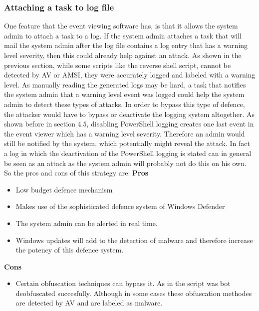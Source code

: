 \documentclass{article}%
\begin{document}
\subsubsection{Attaching a task to log file}
One feature that the event viewing software has, is that it allows the system admin to attach a task to a log. If the system admin attaches a task that will mail the system admin after the log file contains a log entry that has a warning level severity, then this could already help against an attack. As shown in the previous section, while some scripts like the reverse shell script, cannot be detected by AV or AMSI, they were accurately logged and labeled with a warning level. As manually reading the generated logs may be hard, a task that notifies the system admin that a warning level event was logged could help the system admin to detect these types of attacks. In order to bypass this type of defence, the attacker would have to bypass or deactivate the logging system altogether. As shown before in section $4.5$, disabling PowerShell logging creates one last event in the event viewer which has a warning level severity. Therefore an admin would still be notified by the system, which potentially might reveal the attack. In fact a log in which the deactivation of the PowerShell logging is stated can in general be seen as an attack as the system admin will probably not do this on his own. So the pros and cons of this strategy are:
\textbf{Pros}
\begin{itemize}
	\item Low budget defence mechanism
	\item Makes use of the sophisticated defence system of Windows Defender
	\item The system admin can be alerted in real time.
	\item Windows updates will add to the detection of malware and therefore increase the potency of this defence system.
\end{itemize}
\textbf{Cons}
\begin{itemize}
	\item Certain obfuscation techniques can bypass it. As in the script was bot deobfuscated succesfully. Although in some cases these obfuscation methodes are detected by AV and are labeled as malware.
\end{itemize}
\end{document}
